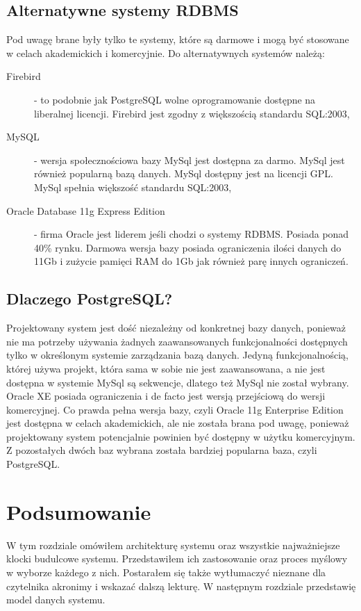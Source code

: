 \documentclass[a4paper,onecolumn,oneside,11pt,wide,floatssmall]{mwrep}
\theoremstyle{definition}
\theoremstyle{plain}%
\theoremstyle{remark}
\begin{document}
\subsection{Alternatywne systemy RDBMS}
Pod uwagę brane były tylko te systemy, które są darmowe i mogą być stosowane w celach akademickich i komercyjnie.
Do alternatywnych systemów należą:
\begin{description}
  \item [Firebird] - to podobnie jak PostgreSQL wolne oprogramowanie dostępne na liberalnej licencji. Firebird jest zgodny z większością standardu SQL:2003,
  \item [MySQL] - wersja społecznościowa bazy MySql jest dostępna za darmo. MySql jest również popularną bazą danych. MySql dostępny jest na licencji GPL. MySql spełnia większość standardu SQL:2003,
  \item [Oracle Database 11g Express Edition] - firma Oracle jest liderem jeśli chodzi o systemy RDBMS. Posiada ponad 40\% rynku. Darmowa wersja bazy posiada ograniczenia ilości danych do 11Gb i zużycie pamięci RAM do 1Gb jak również parę innych ograniczeń. 
\end{description}

\subsection{Dlaczego PostgreSQL?}
Projektowany system jest dość niezależny od konkretnej bazy danych, ponieważ nie ma potrzeby używania żadnych zaawansowanych funkcjonalności dostępnych tylko w określonym systemie zarządzania bazą danych. Jedyną funkcjonalnością, której używa projekt, która sama w sobie nie jest zaawansowana, a nie jest dostępna w systemie MySql są sekwencje, dlatego też MySql nie został wybrany. Oracle XE posiada ograniczenia i de facto jest wersją przejściową do wersji komercyjnej. Co prawda pełna wersja bazy, czyli Oracle 11g Enterprise Edition jest dostępna w celach akademickich, ale nie została brana pod uwagę, ponieważ projektowany system potencjalnie powinien być dostępny w użytku komercyjnym. Z pozostałych dwóch baz wybrana została bardziej popularna baza, czyli PostgreSQL.

\section{Podsumowanie}
W tym rozdziale omówiłem architekturę systemu oraz wszystkie najważniejsze klocki budulcowe systemu. Przedstawiłem ich zastosowanie oraz proces myślowy w wyborze każdego z nich. Postarałem się także wytłumaczyć nieznane dla czytelnika akronimy i wskazać dalszą lekturę. W następnym rozdziale przedstawię model danych systemu.
\end{document}
